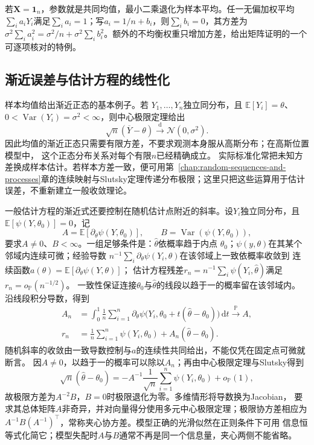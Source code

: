 若\(\bm X=\bm1_n\)，参数就是共同均值，最小二乘退化为样本平均。任一无偏加权平均\(\sum_i a_iY_i\)满足\(\sum_i a_i=1\)；写\(a_i=1/n+b_i\)，则\(\sum_i b_i=0\)，其方差为
\(\sigma^2\sum_i a_i^2=\sigma^2/n+\sigma^2\sum_i b_i^2\)。额外的不均衡权重只增加方差，给出矩阵证明的一个可逐项核对的特例。
\subsection{渐近误差与估计方程的线性化}
样本均值给出渐近正态的基本例子。若
\(Y_1,\ldots,Y_n\)独立同分布，且
\(\mathbb{E}[Y_i]=\theta\)、
\(0<\operatorname{Var}(Y_i)=\sigma^2<\infty\)，则中心极限定理给出
\[
  \sqrt n(\overline Y-\theta)
  \xrightarrow{\mathrm d}\mathcal N(0,\sigma^2).
\]
因此均值的渐近正态只需要有限方差，不要求观测本身服从高斯分布；在高斯位置模型中，
这个正态分布关系对每个有限\(n\)已经精确成立。
实际标准化常把未知方差换成样本估计。若样本方差一致，便可用第~\ref{chap:random-sequences-and-processes}章的连续映射与Slutsky定理传递分布极限；这里只把这些运算用于估计误差，不重新建立一般收敛理论。

一般估计方程的渐近式还要控制在随机估计点附近的斜率。设\(Y_i\)独立同分布，且
\(\mathbb{E}[\psi(Y,\theta_0)]=0\)，记
\[
  A=\mathbb{E}[\partial_\theta\psi(Y,\theta_0)],
  \qquad B=\operatorname{Var}(\psi(Y,\theta_0)),
\]
要求\(A\neq0\)、\(B<\infty\)。一组足够条件是：\(\widehat\theta\)依概率趋于内点
\(\theta_0\)；\(\psi(y,\theta)\)在其某个邻域内连续可微；经验导数
\(n^{-1}\sum_i\partial_\theta\psi(Y_i,\theta)\)在该邻域上一致依概率收敛到
连续函数\(a(\theta)=\mathbb E[\partial_\theta\psi(Y,\theta)]\)；
估计方程残差\(r_n=n^{-1}\sum_i\psi(Y_i,\widehat\theta)\)满足
\(r_n=o_{\mathbb P}(n^{-1/2})\)。
一致性保证连接\(\theta_0\)与\(\widehat\theta\)的线段以趋于一的概率留在该邻域内。
沿线段积分导数，得到
\[
\begin{aligned}
 A_n&=\int_0^1\frac1n\sum_{i=1}^n
  \partial_\theta\psi\bigl(Y_i,\theta_0+t(\widehat\theta-\theta_0)\bigr)\,\mathrm dt
  \xrightarrow{\mathbb P}A,\\
 r_n&=\frac1n\sum_{i=1}^n\psi(Y_i,\theta_0)+A_n(\widehat\theta-\theta_0).
\end{aligned}
\]
随机斜率的收敛由一致导数控制与\(a\)的连续性共同给出，不能仅凭在固定点可微就断言。
因\(A\neq0\)，以趋于一的概率可以除以\(A_n\)；再由中心极限定理与Slutsky得到
\[
  \sqrt n(\widehat\theta-\theta_0)
  =
  -A^{-1}\frac1{\sqrt n}\sum_{i=1}^n\psi(Y_i,\theta_0)
  +o_{\mathbb{P}}(1),
\]
故极限方差为\(A^{-2}B\)，\(B=0\)时极限退化为零。多维情形将导数换为Jacobian，
要求其总体矩阵\(A\)非奇异，并对向量得分使用多元中心极限定理；极限协方差相应为
\(A^{-1}B(A^{-1})^\top\)，常称夹心协方差。模型正确的光滑似然在正则条件下可用
信息恒等式化简它；模型失配时\(A\)与\(B\)通常不再是同一个信息量，夹心两侧不能省略。

